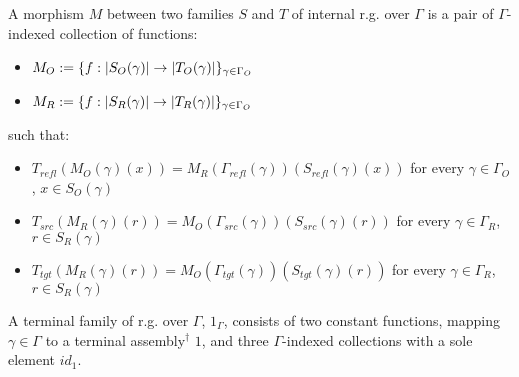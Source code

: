 \documentclass[12pt,a4paper]{article}
\def\cAsm{\mathcal{A}\mathit{sm}^\dagger}
\def\src{_{src}}\alwaysmath{src}
\def\rfl{_{refl}}\alwaysmath{rfl}
\def\tgt{_{tgt}}\alwaysmath{tgt}
\renewcommand{\O}{_{O}}
\newcommand{\R}{\ensuremath{_{R}}}
\begin{document}
A morphism $M$ between two families $S$ and $T$ of internal r.g. over $\Gamma$ is a pair of $\Gamma$-indexed collection of functions:
\begin{itemize}[noitemsep]
  \item $M\O \define \{f : \carr{S\O(\gamma)} \to \carr{T\O(\gamma)} \}_{\gamma \in \Gamma\O}$
  \item $M\R \define \{f : \carr{S\R(\gamma)} \to \carr{T\R(\gamma)} \}_{\gamma \in \Gamma\O}$
\end{itemize}
such that:
\begin{itemize}[noitemsep]
  \item $T\rfl(M\O (\gamma)(x)) = M\R(\Gamma\rfl(\gamma))(S\rfl(\gamma)(x))$ for every $\gamma \in \Gamma\O$, $x \in S\O(\gamma)$
  \item $T\src(M\R (\gamma)(r)) = M\O(\Gamma\src(\gamma))(S\src(\gamma)(r))$ for every $\gamma \in \Gamma\R$, $r \in S\R(\gamma)$
  \item $T\tgt(M\R (\gamma)(r)) = M\O(\Gamma\tgt(\gamma))(S\tgt(\gamma)(r))$ for every $\gamma \in \Gamma\R$, $r \in S\R(\gamma)$
  
\end{itemize}

A terminal family of r.g. over $\Gamma$, $1_\Gamma$,  consists of two constant functions, mapping $\gamma\in\Gamma$ to a terminal assembly$^\dagger$ $1$, and three $\Gamma$-indexed collections with a sole element $id_1$.\\

\end{document}
